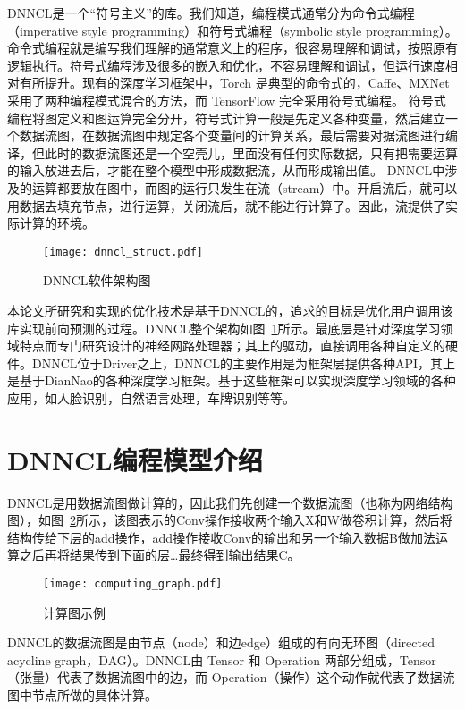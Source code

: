 DNNCL是一个“符号主义”的库。我们知道，编程模式通常分为命令式编程\cite{improgram}（imperative style programming）和符号式编程（symbolic style programming）。命令式编程就是编写我们理解的通常意义上的程序，很容易理解和调试，按照原有逻辑执行。符号式编程涉及很多的嵌入和优化，不容易理解和调试，但运行速度相对有所提升。现有的深度学习框架中，Torch 是典型的命令式的，Caffe、MXNet 采用了两种编程模式混合的方法，而 TensorFlow 完全采用符号式编程\cite{syprogram}。
符号式编程将图定义和图运算完全分开，符号式计算一般是先定义各种变量，然后建立一个数据流图，在数据流图中规定各个变量间的计算关系，最后需要对据流图进行编译，但此时的数据流图还是一个空壳儿，里面没有任何实际数据，只有把需要运算的输入放进去后，才能在整个模型中形成数据流，从而形成输出值。
DNNCL中涉及的运算都要放在图中，而图的运行只发生在流（stream）中。开启流后，就可以用数据去填充节点，进行运算，关闭流后，就不能进行计算了。因此，流提供了实际计算的环境。

\begin{figure}[htb]
  \centering
  \texttt{[image: dnncl\_struct.pdf]}
  \caption{DNNCL软件架构图}
  \label{fig:dnncl-struct}
\end{figure}

本论文所研究和实现的优化技术是基于DNNCL的，追求的目标是优化用户调用该库实现前向预测的过程。DNNCL整个架构如图~\ref{fig:dnncl-struct}所示。最底层是针对深度学习领域特点而专门研究设计的神经网路处理器；其上的驱动，直接调用各种自定义的硬件。DNNCL位于Driver之上，DNNCL的主要作用是为框架层提供各种API，其上是基于DianNao的各种深度学习框架。基于这些框架可以实现深度学习领域的各种应用，如人脸识别，自然语言处理，车牌识别等等。



\section{DNNCL编程模型介绍}
DNNCL是用数据流图做计算的，因此我们先创建一个数据流图（也称为网络结构图），如图~\ref{fig:cumputing-graph}所示，该图表示的Conv操作接收两个输入X和W做卷积计算，然后将结构传给下层的add操作，add操作接收Conv的输出和另一个输入数据B做加法运算之后再将结果传到下面的层…最终得到输出结果C。

\begin{figure}[htb]
  \centering
  \texttt{[image: computing\_graph.pdf]}
  \caption{计算图示例}
  \label{fig:cumputing-graph}
\end{figure}

DNNCL的数据流图是由节点（node）和边edge）组成的有向无环图（directed acycline graph，DAG）。DNNCL由 Tensor 和 Operation 两部分组成，Tensor（张量）代表了数据流图中的边，而 Operation（操作）这个动作就代表了数据流图中节点所做的具体计算。

